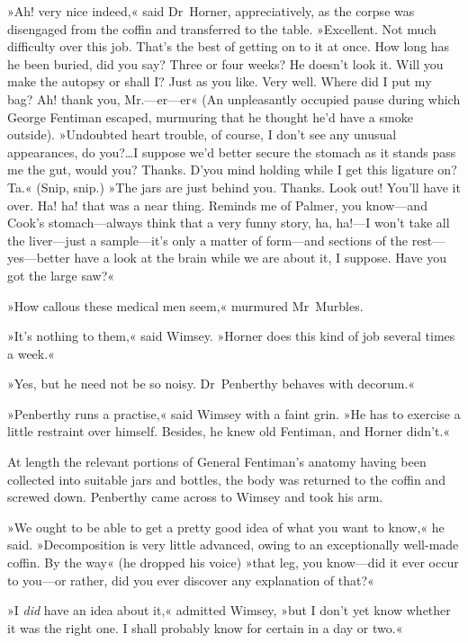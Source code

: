 »Ah! very nice indeed,« said Dr~Horner, appreciatively, as the corpse was disengaged from the coffin and transferred to the table. »Excellent. Not much difficulty over this job. That's the best of getting on to it at once. How long has he been buried, did you say? Three or four weeks? He doesn't look it. Will you make the autopsy or shall I? Just as you like. Very well. Where did I put my bag? Ah! thank you, Mr.—er—er\longdash« (An unpleasantly occupied pause during which George Fentiman escaped, murmuring that he thought he'd have a smoke outside). »Undoubted heart trouble, of course, I don't see any unusual appearances, do you?\dots I suppose we'd better secure the stomach as it stands \textellipsis  pass me the gut, would you? Thanks. D'you mind holding while I get this ligature on? Ta.« (Snip, snip.) »The jars are just behind you. Thanks. Look out! You'll have it over. Ha! ha! that was a near thing. Reminds me of Palmer, you know—and Cook's stomach—always think that a very funny story, ha, ha!—I won't take all the liver—just a sample—it's only a matter of form—and sections of the rest—yes—better have a look at the brain while we are about it, I suppose. Have you got the large saw?«

»How callous these medical men seem,« murmured Mr~Murbles.

»It's nothing to them,« said Wimsey. »Horner does this kind of job several times a week.«

»Yes, but he need not be so noisy. Dr~Penberthy behaves with decorum.«

»Penberthy runs a practise,« said Wimsey with a faint grin. »He has to exercise a little restraint over himself. Besides, he knew old Fentiman, and Horner didn't.«

At length the relevant portions of General Fentiman's anatomy having been collected into suitable jars and bottles, the body was returned to the coffin and screwed down. Penberthy came across to Wimsey and took his arm.

»We ought to be able to get a pretty good idea of what you want to know,« he said. »Decomposition is very little advanced, owing to an exceptionally well-made coffin. By the way« (he dropped his voice) »that leg, you know—did it ever occur to you—or rather, did you ever discover any explanation of that?«

»I \textit{did} have an idea about it,« admitted Wimsey, »but I don't yet know whether it was the right one. I shall probably know for certain in a day or two.«

